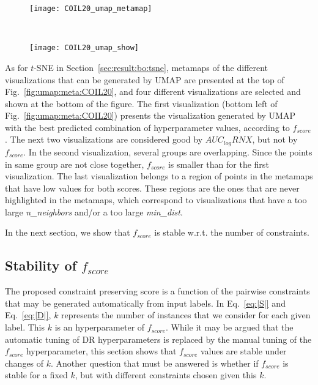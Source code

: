 \begin{figure*}[ht!]
    \centering
    \begin{subfigure}[b]{.8\linewidth}
        \centering
        \texttt{[image: COIL20\_umap\_metamap]}
    \end{subfigure}
    ~
    \begin{subfigure}[b]{.8\linewidth}
        \texttt{[image: COIL20\_umap\_show]}
    \end{subfigure}
    \caption{Metamaps and visualizations with hyperparameters by BayOpt based on $f_{score}$ for \emph{COIL20}.}
    \label{fig:umap:meta:COIL20}
\end{figure*}

As for $t$-SNE in Section~\ref{sec:result:bo:tsne}, metamaps of the different visualizations that can be generated by UMAP are presented at the top of Fig.~\ref{fig:umap:meta:COIL20}, and four different visualizations are selected and shown at the bottom of the figure.
The first visualization (bottom left of Fig.~\ref{fig:umap:meta:COIL20}) presents the visualization generated by UMAP with the best predicted combination of hyperparameter values, according to $f_{score}$.
The next two visualizations are considered good by $AUC_{log}RNX$, but not by $f_{score}$.
In the second visualization, several groups are overlapping. Since the points in same group are not close together, $f_{score}$ is smaller than for the first visualization.
The last visualization belongs to a region of points in the metamaps that have low values for both scores.
These regions are the ones that are never highlighted in the metamaps, which correspond to visualizations that have a too large \emph{n\_neighbors} and/or a too large \emph{min\_dist}. 

In the next section, we show that $f_{score}$ is stable w.r.t. the number of constraints.

\subsection{Stability of $f_{score}$}\label{sec:result:stability}

The proposed constraint preserving score is a function of the pairwise constraints that may be generated automatically from input labels. In Eq.~\ref{eq:|S|} and Eq.~\ref{eq:|D|}, $k$ represents the number of instances that we consider for each given label. This $k$ is an hyperparameter of $f_{score}$. While it may be argued that the automatic tuning of DR hyperparameters is replaced by the manual tuning of the $f_{score}$ hyperparameter, this section shows that $f_{score}$ values are stable under changes of $k$. Another question that must be answered is whether if $f_{score}$ is stable for a fixed $k$, but with different constraints chosen given this $k$.

